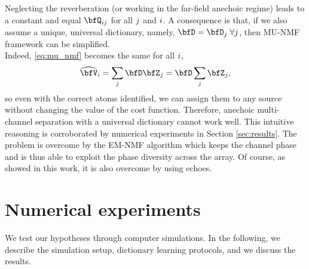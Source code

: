 \mynewline
Neglecting the reverberation (or working in the far-field anechoic regime) leads to a constant and equal $\vQ_{\idxMicSrc}$ for all $j$ and $i$.
A consequence is that, if we also assume a unique, universal dictionary, namely, $\mD = \mD_j\;\forall j$, then \ac{MU}-\ac{NMF} framework can be simplified.
\\Indeed, \eqref{eq:mu_nmf} becomes the same for all $i$,
\begin{equation*}
    \wh{\mV}_\idxMic = \sum_{\idxSrc} \mD \mZ_\idxSrc = \mD \sum_\idxSrc \mZ_\idxSrc,
\end{equation*}
so even with the correct atoms identified, we can assign them to any source without changing the value of the cost function.
Therefore, anechoic multi-channel separation with a universal dictionary cannot work well.
This intuitive reasoning is corroborated by numerical experiments in Section \ref{sec:results}.
The problem is overcome by the \ac{EM}-\ac{NMF} algorithm which keeps the channel phase and is thus able to exploit the phase diversity across the array.
Of course, as showed in this work, it is also overcome by using echoes.

\section{Numerical experiments}

We test our hypotheses through computer simulations.
In the following, we describe the simulation setup, dictionary learning protocols, and we discuss the results.

